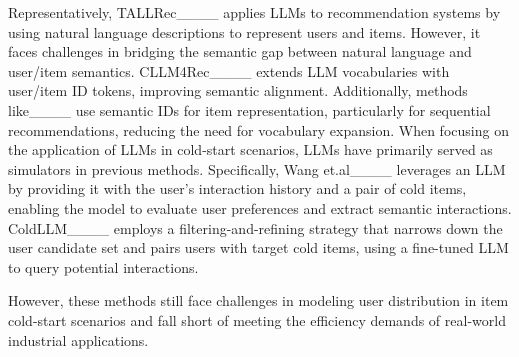 Representatively, TALLRec____ applies LLMs to recommendation systems by using natural language descriptions to represent users and items. However, it faces challenges in bridging the semantic gap between natural language and user/item semantics. CLLM4Rec____ extends LLM vocabularies with user/item ID tokens, improving semantic alignment. Additionally, methods like____ use semantic IDs for item representation, particularly for sequential recommendations, reducing the need for vocabulary expansion. When focusing on the application of LLMs in cold-start scenarios, LLMs have primarily served as simulators in previous methods. Specifically, Wang et.al____ leverages an LLM by providing it with the user’s interaction history and a pair of cold items, enabling the model to evaluate user preferences and extract semantic interactions. ColdLLM____ employs a filtering-and-refining strategy that narrows down the user candidate set and pairs users with target cold items, using a fine-tuned LLM to query potential interactions.


However, these methods still face challenges in modeling user distribution in item cold-start scenarios and fall short of meeting the efficiency demands of real-world industrial applications.